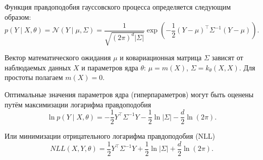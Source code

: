 \documentclass[11pt,a4paper]{article}
\begin{document}
    Функция правдоподобия гауссовского процесса определяется следующим
образом: \[
  p(Y \mid X, \theta) = \mathcal{N}(Y \mid \mu, \Sigma) = 
  \frac{1}{\sqrt{(2\pi)^d \lvert\Sigma\rvert}} \exp{ \left( -\frac{1}{2}(Y-\mu)^\top \Sigma^{-1} (Y-\mu) \right)}.
\]

    Вектор математического ожидания \(\mu\) и ковариационная матрица
\(\Sigma\) зависят от наблюдаемых данных \(X\) и параметров ядра
\(\theta\): \(\mu = m(X)\), \(\Sigma = k_\theta(X, X)\). Для простоты
полагаем \(m(X) = 0\).

    Оптимальные значения параметров ядра (гиперпараметров) могут быть
оценены путём максимизации логарифма правдоподобия \[
  \ln p(Y \mid X, \theta) = -\frac{1}{2} Y^\top \Sigma^{-1} Y - \frac{1}{2} \ln \lvert \Sigma \rvert - \frac{d}{2} \ln(2\pi). \tag{1}
\]

Или минимизации отрицательного логарифма правдоподобия (NLL) \[
  NLL(X, Y, \theta) = \frac{1}{2} Y^\top \Sigma^{-1} Y + \frac{1}{2} \ln \lvert \Sigma \rvert + \frac{d}{2} \ln(2\pi). \tag{1}
\]
\end{document}
